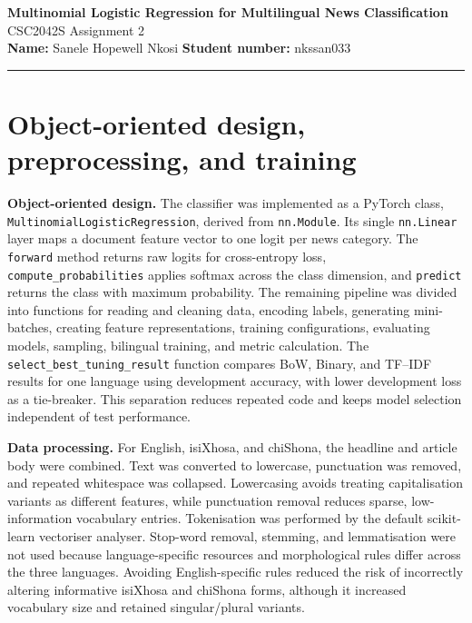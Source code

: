 \documentclass[10pt,a4paper]{article}
\begin{document}
\begin{center}
{\Large\bfseries Multinomial Logistic Regression for Multilingual News Classification}\\[2pt]
{\large CSC2042S Assignment 2}\\[4pt]
\textbf{Name:} Sanele Hopewell Nkosi \hfill
\textbf{Student number:} nkssan033
\end{center}
\vspace{-5pt}\hrule\vspace{4pt}

\section{Object-oriented design, preprocessing, and training}

\textbf{Object-oriented design.}
The classifier was implemented as a PyTorch class, \texttt{MultinomialLogisticRegression}, derived from \texttt{nn.Module}. Its single \texttt{nn.Linear} layer maps a document feature vector to one logit per news category. The \texttt{forward} method returns raw logits for cross-entropy loss, \texttt{compute\_probabilities} applies softmax across the class dimension, and \texttt{predict} returns the class with maximum probability. The remaining pipeline was divided into functions for reading and cleaning data, encoding labels, generating mini-batches, creating feature representations, training configurations, evaluating models, sampling, bilingual training, and metric calculation. The \texttt{select\_best\_tuning\_result} function compares BoW, Binary, and TF--IDF results for one language using development accuracy, with lower development loss as a tie-breaker. This separation reduces repeated code and keeps model selection independent of test performance.

\textbf{Data processing.}
For English, isiXhosa, and chiShona, the headline and article body were combined. Text was converted to lowercase, punctuation was removed, and repeated whitespace was collapsed. Lowercasing avoids treating capitalisation variants as different features, while punctuation removal reduces sparse, low-information vocabulary entries. Tokenisation was performed by the default scikit-learn vectoriser analyser. Stop-word removal, stemming, and lemmatisation were not used because language-specific resources and morphological rules differ across the three languages. Avoiding English-specific rules reduced the risk of incorrectly altering informative isiXhosa and chiShona forms, although it increased vocabulary size and retained singular/plural variants.
\end{document}
